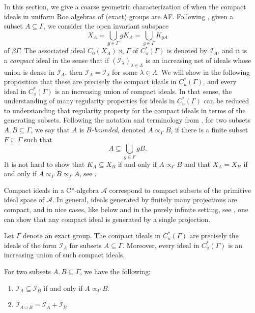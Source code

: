 \documentclass[12pt, a4paper, oneside]{amsart}
\newcommand{\0}{\mathbf{0}}
\newcommand{\1}{\mathbf{1}}
\newcommand{\A}{\mathscr{A}}
\newcommand{\I}{\mathscr{I}}
\newcommand{\gbd}{\propto_\Gamma}
\begin{document}
	In this section, we give a coarse geometric characterization of when the compact ideals in uniform Roe algebras of (exact) groups are AF. Following \cite{kellerhals}, given a subset \(A \subseteq \Gamma\), we consider the open invariant subspace \[X_A = \bigcup_{g \in \Gamma} gK_A = \bigcup_{g \in \Gamma} K_{gA}\] of \(\beta \Gamma\). The associated ideal \(C_0(X_A) \rtimes_r \Gamma\) of \(C_u^*(\Gamma)\) is denoted by \(\I_A\), and it is a \textit{compact} ideal in the sense that if \((\I_\lambda)_{\lambda \in \Lambda}\) is an increasing net of ideals whose union is dense in \(\I_A\), then \(\I_A = \I_\lambda\) for some \(\lambda \in \Lambda\). We will show in the following proposition that these are precisely the compact ideals in \(C_u^*(\Gamma)\), and every ideal in \(C_u^*(\Gamma)\) is an increasing union of compact ideals. In that sense, the understanding of many regularity properties for ideals in \(C_u^*(\Gamma)\) can be reduced to understanding that regularity property for the compact ideals in terms of the generating subsets. Following the notation and terminology from \cite{kellerhals}, for two subsets \(A, B \subseteq \Gamma\), we say that \(A\) is \(B\)\textit{-bounded}, denoted \(A \gbd B\), if there is a finite subset \(F \subseteq \Gamma\) such that \[A \subseteq \bigcup_{g \in F} gB.\] It is not hard to show that \(K_A \subseteq X_B\) if and only if \(A \gbd B\) and that \(X_A = X_B\) if and only if \(A \gbd B \gbd A\), see \cite[Lemma 2.5]{kellerhals}. 
	
	Compact ideals in a C*-algebra \(\A\) correspond to compact subsets of the primitive ideal space of \(\A\). In general, ideals generated by finitely many projections are compact, and in nice cases, like below and in the purely infinite setting, see \cite[Proposition 2.7]{pasnicu_rordam}, one can show that any compact ideal is generated by a single projection. 
	
	\begin{proposition}
		\label{prop_compact}
		Let \(\Gamma\) denote an exact group. The compact ideals in \(C_u^*(\Gamma)\) are precisely the ideals of the form \(\I_A\) for subsets \(A \subseteq \Gamma\). Moreover, every ideal in \(C_u^*(\Gamma)\) is an increasing union of such compact ideals. 
		
		For two subsets \(A, B \subseteq \Gamma\), we have the following: 
		\begin{enumerate}
			\item \(\I_A \subseteq \I_B\) if and only if \(A \gbd B\). 
			\item \(\I_{A \cup B} = \I_A + \I_B\). 
		\end{enumerate}
	\end{proposition}
	
\end{document}
